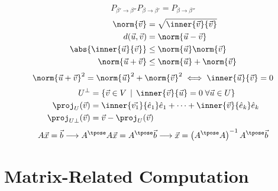 \documentclass[10pt, a4paper]{article}
\begin{document}
\begin{landscape}
\begin{multicols}{3}
    \[P_{\beta' \to \beta''} P_{\beta \to \beta'} = P_{\beta \to \beta''}\]
    \begin{align*}
        \norm{\vec{v}} &= \sqrt{\inner{\vec{v}}{\vec{v}}} \\
        d(\vec{u}, \vec{v}) &= \norm{\vec{u} - \vec{v}} \\
        \abs{\inner{\vec{u}}{\vec{v}}} &\leq \norm{\vec{u}} \norm{\vec{v}} \\
        \norm{\vec{u} + \vec{v}} &\leq \norm{\vec{u}} + \norm{\vec{v}}
    \end{align*}
    \[
        \norm{\vec{u} + \vec{v}}^{2} = \norm{\vec{u}}^{2} + \norm{\vec{v}}^{2} \iff \inner{\vec{u}}{\vec{v}} = 0
    \]
    \begin{align*}
        U^{\perp} &= \left\{ \vec{v} \in V \,\mid\, \inner{\vec{v}}{\vec{u}} = 0 \;\forall \vec{u} \in U \right\} \\
        \proj_{U} (\vec{v}) &= \inner{\vec{v_1}}{\hat e_{1}} \hat e_{1} + \cdots + \inner{\vec{v}}{\hat e_{k}} \hat e_{k} \\
    \proj_{U \perp} (\vec{v}) &= \vec{v} - \proj_{U} (\vec{v})
    \end{align*}
    \[A\vec{x} = \vec{b} \longrightarrow A^{\tpose} A \vec{x} = A^{\tpose} \vec{b}
    \longrightarrow \vec{x} = \left(A^{\tpose} A\right)^{-1} A^{\tpose} \vec{b}\]

    \section{Matrix-Related Computation}


\end{multicols}
\end{landscape}
\end{document}
